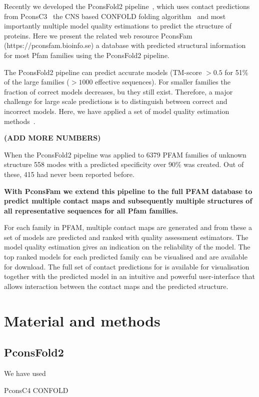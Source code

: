 \documentclass[a4,center,fleqn]{NAR}
\begin{document}
Recently we developed the PconsFold2 pipeline~\cite{Michel28881974}, which uses contact
predictions from PconsC3~\cite{Michel28535189} the CNS based CONFOLD folding
algorithm~\cite{Adhikari25974172} and most importantly multiple model quality estimations
\cite{Uziela28052925,Lundstrom:2001} to predict the structure of
proteins. Here we present the related web resource PconsFam
(https://pconsfam.bioinfo.se) a database with predicted structural
information for most Pfam families using the PconsFold2
pipeline.


The PconsFold2 pipeline can predict accurate models (TM-score $>0.5$
for 51\% of the large families ($>1000$ effective sequences). For
smaller families the fraction of correct models decreases, bu they
still exist. Therefore, a major challenge for large scale predictions
is to distinguish between correct and incorrect models. Here, we have
applied a set of model quality estimation methods~\cite{Kryshtafovych28833563}.


\bf{(ADD MORE NUMBERS)}


When the PconsFold2 pipeline was applied to 6379 PFAM families of
unknown structure 558 modes with a predicted specificity over 90\% was
created. Out of these, 415 had never been reported before.

{\bf With
PconsFam we extend this pipeline to the full PFAM database to predict
multiple contact maps and subsequently multiple structures of all
representative sequences for all Pfam families. }

For each family in
PFAM, multiple contact maps are generated and from these a set of
models are predicted and ranked with quality assessment
estimators. The model quality estimation gives an indication on the
reliability of the model. The top ranked models for each predicted
family can be visualised and are available for download. The full set
of contact predictions for is available for visualisation together
with the predicted model in an intuitive and powerful user-interface
that allows interaction between the contact maps and the predicted
structure. 

\section{Material and methods}
\subsection{PconsFold2}
We have used 

PconsC4
CONFOLD
\end{document}
